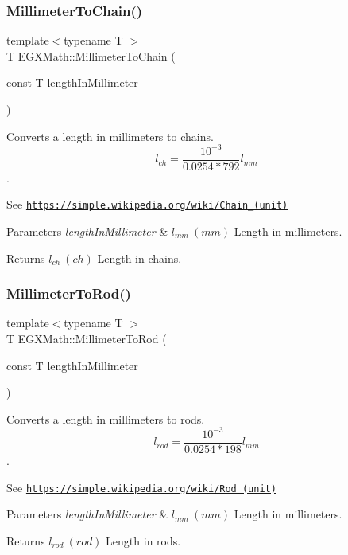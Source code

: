 \subsubsection{\texorpdfstring{Millimeter\+To\+Chain()}{MillimeterToChain()}}
{\footnotesize\ttfamily template$<$typename T $>$ \\
T E\+G\+X\+Math\+::\+Millimeter\+To\+Chain (\begin{DoxyParamCaption}\item[{const T}]{length\+In\+Millimeter }\end{DoxyParamCaption})}



Converts a length in millimeters to chains. \[ l_{ch}= \frac{10^{-3}}{0.0254 * 792} l_{mm} \]. 

See \href{https://simple.wikipedia.org/wiki/Chain_(unit)}{\tt https\+://simple.\+wikipedia.\+org/wiki/\+Chain\+\_\+(unit)} 
\begin{DoxyParams}{Parameters}
{\em length\+In\+Millimeter} & $ l_{mm}\ (mm)$ Length in millimeters. \\
\hline
\end{DoxyParams}
\begin{DoxyReturn}{Returns}
$ l_{ch}\ (ch)$ Length in chains. 
\end{DoxyReturn}
\mbox{\label{group___e_g_x_math-_conversions-_length_conversions-_millimeter-_surveyors_ga658a03332f16e17bdd23bd770091b221}} 
\subsubsection{\texorpdfstring{Millimeter\+To\+Rod()}{MillimeterToRod()}}
{\footnotesize\ttfamily template$<$typename T $>$ \\
T E\+G\+X\+Math\+::\+Millimeter\+To\+Rod (\begin{DoxyParamCaption}\item[{const T}]{length\+In\+Millimeter }\end{DoxyParamCaption})}



Converts a length in millimeters to rods. \[ l_{rod}= \frac{10^{-3}}{0.0254 * 198} l_{mm} \]. 

See \href{https://simple.wikipedia.org/wiki/Rod_(unit)}{\tt https\+://simple.\+wikipedia.\+org/wiki/\+Rod\+\_\+(unit)} 
\begin{DoxyParams}{Parameters}
{\em length\+In\+Millimeter} & $ l_{mm}\ (mm)$ Length in millimeters. \\
\hline
\end{DoxyParams}
\begin{DoxyReturn}{Returns}
$ l_{rod}\ (rod)$ Length in rods. 
\end{DoxyReturn}
